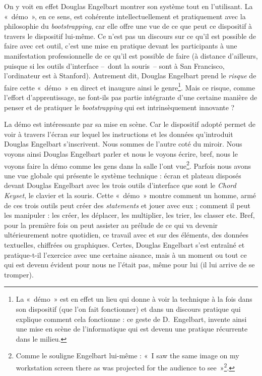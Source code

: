 \documentclass{FramateX}
\begin{document}
\begin{refsection}
On y voit en effet Douglas Engelbart montrer son système tout en l'utilisant. La «~démo~», en ce sens, est cohérente
intellectuellement et pratiquement avec la philosophie du
\textit{bootstrapping}, car elle offre une vue de ce que peut ce dispositif à
travers le dispositif lui-même. Ce n'est pas un discours sur ce qu'il
est possible de faire avec cet outil, c'est une mise en pratique devant
les participants à une manifestation professionnelle de ce qu'il est
possible de faire (à distance d'ailleurs, puisque si les outils
d'interface --~dont la souris~-- sont à San Francisco, l'ordinateur est à
Stanford). Autrement dit, Douglas Engelbart prend le \textit{risque} de
faire cette «~démo~» en direct et inaugure ainsi le genre\footnote{La
«~démo~» est en effet un lieu qui donne à voir la technique à la fois
dans son dispositif (que l'on fait fonctionner) et dans un discours
pratique qui explique comment cela fonctionne : ce geste de D.~Engelbart, 
invente ainsi une mise en scène de l'informatique qui
est devenu une pratique récurrente dans le milieu.}. Mais ce risque,
comme l'effort d'apprentissage, ne font-ils pas partie intégrante d'une
certaine manière de penser et de pratiquer le \textit{bootstrapping} qui est
intrinsèquement innovante ? 

La démo est intéressante par sa mise en scène. Car le
dispositif adopté permet de voir à travers l'écran sur lequel les
instructions et les données qu'introduit Douglas Engelbart
s'inscrivent. Nous sommes de l'autre coté du miroir. Nous voyons ainsi
Douglas Engelbart parler et nous le voyons écrire, bref, nous le voyons
faire la démo comme les gens dans la salle l'ont vue\footnote{Comme le
souligne Engelbart lui-même : «~I saw the same image on my workstation
screen there as was projected for the audience to see~»\footnote{\cite[p.~140]{bardinibootstrapping2001}}.}. Parfois nous avons une vue globale qui présente le système
technique : écran et plateau disposés devant Douglas Engelbart avec les
trois outils d'interface que sont le \textit{Chord Keyset}, le clavier et la
souris. Cette «~démo~» montre comment un homme, armé de ces trois
outils peut créer des \textit{statements} et jouer avec eux ; comment il
peut les manipuler : les créer, les déplacer, les multiplier, les
trier, les classer etc. Bref, pour la première fois on peut assister au
prélude de ce qui va devenir ultérieurement notre quotidien, ce travail
avec et sur des éléments, des données textuelles, chiffrées ou
graphiques. Certes, Douglas Engelbart s'est entraîné et pratique-t-il
l'exercice avec une certaine aisance, mais à un moment ou tout ce qui
est devenu évident pour nous ne l'était pas, même pour lui (il lui
arrive de se tromper).


\end{refsection}
\end{document}
